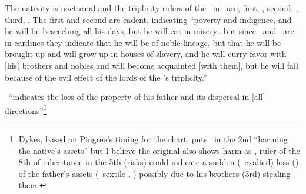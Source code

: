 The nativity is nocturnal and the triplicity rulers of the \Moon\, in \Gemini\, are, first, \Mercury, second, \Saturn, third, \Jupiter. The first and second are cadent, indicating ``poverty and indigence, and he will be beseeching all his days, but he will eat in misery...but since \Jupiter\, and \Venus\, are in cardines they indicate that he will be of noble lineage, but that he will be brought up and will grow up in houses of slavery, and he will curry favor with [his] brothers and nobles and will become acquainted [with them], but he will fail because of the evil effect of the lords of the \Moon's triplicity.''

\Mars\, ``indicates the loss of the property of his father and its dispersal in [all] directions''\footnote{Dykes, based on Pingree's timing for the chart, puts \Mars\, in the 2nd ``harming the native's assets'' but I believe the original also shows harm as \Mars, ruler of the 8th of inheritance in the 5th (risks) could indicate a sudden (\Mars\, exalted) loss (\Mars) of the father's assets (\Mars\, sextile \Saturn, \Sun) possibly due to his brothers (3rd) stealing them.}
